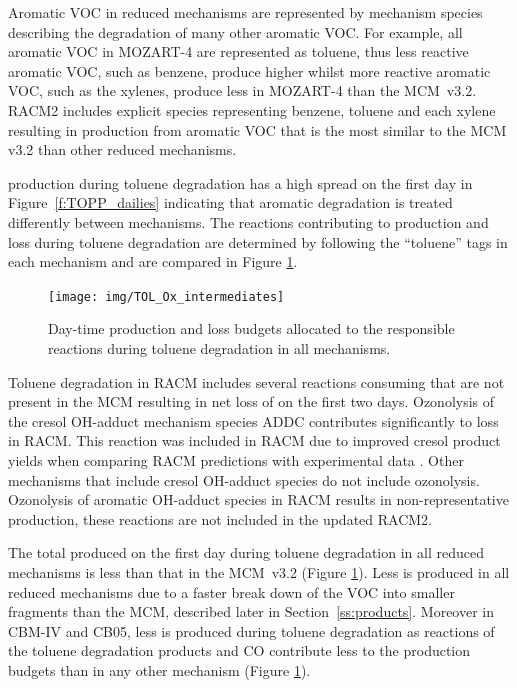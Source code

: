 Aromatic VOC in reduced mechanisms are represented by mechanism species describing the degradation of many other aromatic VOC.
For example, all aromatic VOC in MOZART-4 are represented as toluene, thus less reactive aromatic VOC, such as benzene, produce higher  whilst more reactive aromatic VOC, such as the xylenes, produce less  in MOZART-4 than the \mbox{MCM v3.2}.
RACM2 includes explicit species representing benzene, toluene and each xylene resulting in  production from aromatic VOC that is the most similar to the MCM v3.2 than other reduced mechanisms.

 production during toluene degradation has a high spread on the first day in \mbox{Figure \ref{f:TOPP_dailies}} indicating that aromatic degradation is treated differently between mechanisms.
The reactions contributing to  production and loss during toluene degradation are determined by following the ``toluene'' tags in each mechanism and are compared in Figure \ref{f:toluene_Ox}.

%
\begin{figure}
    \centering
    \texttt{[image: img/TOL\_Ox\_intermediates]}
    \vspace{0mm}
    \caption{Day-time  production and loss budgets allocated to the responsible reactions during toluene degradation in all mechanisms.}
    \vspace{-4mm}
    \label{f:toluene_Ox}
\end{figure}
%
Toluene degradation in RACM includes several reactions consuming  that are not present in the MCM resulting in net loss of  on the first two days.
Ozonolysis of the cresol OH-adduct mechanism species ADDC contributes significantly to  loss in RACM.
This reaction was included in RACM due to improved cresol product yields when comparing RACM predictions with experimental data \citep{Stockwell:1997}. 
Other mechanisms that include cresol OH-adduct species do not include ozonolysis.
Ozonolysis of aromatic OH-adduct species in RACM results in non-representative  production, these reactions are not included in the updated RACM2.

The total  produced on the first day during toluene degradation in all reduced mechanisms is less than that in the \mbox{MCM v3.2} (Figure \ref{f:toluene_Ox}).
Less  is produced in all reduced mechanisms due to a faster break down of the VOC into smaller fragments than the MCM, described later in \mbox{Section \ref{ss:products}}.
Moreover in CBM-IV and CB05, less  is produced during toluene degradation as reactions of the toluene degradation products  and CO contribute less to the  production budgets than in any other mechanism (Figure \ref{f:toluene_Ox}).

